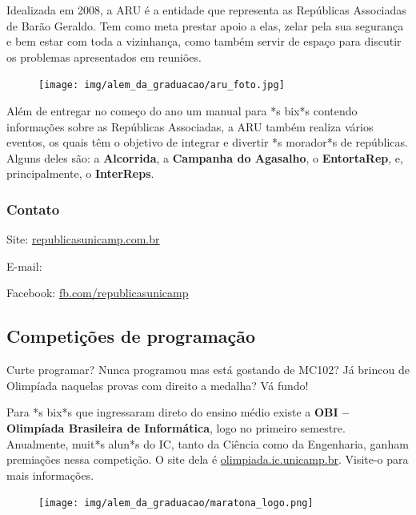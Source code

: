 Idealizada em 2008, a ARU é a entidade que representa as Repúblicas Associadas
de Barão Geraldo.  Tem como meta prestar apoio a elas, zelar pela sua segurança
e bem estar com toda a vizinhança, como também servir de espaço para discutir
os problemas apresentados em reuniões.

\begin{figure}[H]
    \centering
    \texttt{[image: img/alem\_da\_graduacao/aru\_foto.jpg]}
\end{figure}

Além de entregar no começo do ano um manual para *s bix*s contendo informações
sobre as Repúblicas Associadas, a ARU também realiza vários eventos, os quais
têm o objetivo de integrar e divertir *s morador*s de repúblicas. Alguns deles
são: a \textbf{Alcorrida}, a \textbf{Campanha do Agasalho}, o
\textbf{EntortaRep}, e, principalmente, o \textbf{InterReps}.

\subsubsection{Contato}

\begin{compactitemize}
\item Site: \url{republicasunicamp.com.br}
\item E-mail: 
\item Facebook: \url{fb.com/republicasunicamp}
\end{compactitemize}

\subsection{Competições de programação}

Curte programar? Nunca programou mas está gostando de MC102? Já brincou de
Olimpíada naquelas provas com direito a medalha? Vá fundo!

Para *s bix*s que ingressaram direto do ensino médio existe a \textbf{OBI --
Olimpíada Brasileira de Informática}, logo no primeiro semestre.  Anualmente,
muit*s alun*s do IC, tanto da Ciência como da Engenharia, ganham premiações
nessa competição. O site dela é \url{olimpiada.ic.unicamp.br}.  Visite-o para
mais informações.

\begin{figure}[h!]
    \centering
    \texttt{[image: img/alem\_da\_graduacao/maratona\_logo.png]}
\end{figure}

